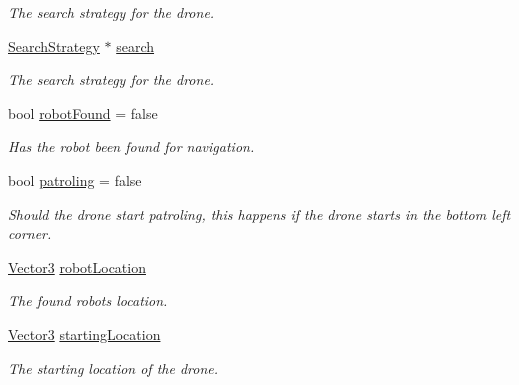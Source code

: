 \begin{DoxyCompactItemize}
\begin{DoxyCompactList}\small\item\em The search strategy for the drone. \end{DoxyCompactList}\item 
\mbox{\label{classDrone_af504841d9023aa2d09b888da08a8de47}} 
\hyperlink{classSearchStrategy}{Search\+Strategy} $\ast$ \hyperlink{classDrone_af504841d9023aa2d09b888da08a8de47}{search}
\begin{DoxyCompactList}\small\item\em The search strategy for the drone. \end{DoxyCompactList}\item 
\mbox{\label{classDrone_a9225859e6bc82f8084cec5959e677303}} 
bool \hyperlink{classDrone_a9225859e6bc82f8084cec5959e677303}{robot\+Found} = false
\begin{DoxyCompactList}\small\item\em Has the robot been found for navigation. \end{DoxyCompactList}\item 
\mbox{\label{classDrone_aa1c4c871bc26db75720e8a9579007188}} 
bool \hyperlink{classDrone_aa1c4c871bc26db75720e8a9579007188}{patroling} = false
\begin{DoxyCompactList}\small\item\em Should the drone start patroling, this happens if the drone starts in the bottom left corner. \end{DoxyCompactList}\item 
\mbox{\label{classDrone_ab52ab733570dcdb842df3b31ca4030ff}} 
\hyperlink{classVector3}{Vector3} \hyperlink{classDrone_ab52ab733570dcdb842df3b31ca4030ff}{robot\+Location}
\begin{DoxyCompactList}\small\item\em The found robot\textquotesingle{}s location. \end{DoxyCompactList}\item 
\mbox{\label{classDrone_a1b2bf80f215cb6625861a638db908634}} 
\hyperlink{classVector3}{Vector3} \hyperlink{classDrone_a1b2bf80f215cb6625861a638db908634}{starting\+Location}
\begin{DoxyCompactList}\small\item\em The starting location of the drone. \end{DoxyCompactList}\item 

\end{DoxyCompactItemize}
